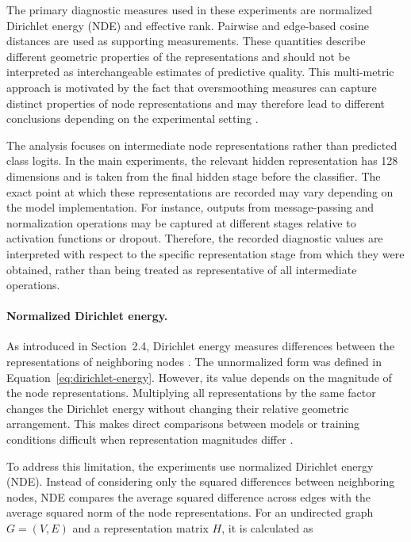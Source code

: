 \documentclass[english]{lni}
\begin{document}
The primary diagnostic measures used in these experiments are normalized Dirichlet energy (NDE) and effective rank. Pairwise and edge-based cosine distances are used as supporting measurements. These quantities describe different geometric properties of the representations and should not be interpreted as interchangeable estimates of predictive quality. This multi-metric approach is motivated by the fact that oversmoothing measures can capture distinct properties of node representations and may therefore lead to different conclusions depending on the experimental setting \cite{rusch2023oversmoothing,arnaiz2026demystifying,zhang2026measuring}.

The analysis focuses on intermediate node representations rather than predicted class logits. In the main experiments, the relevant hidden representation has 128 dimensions and is taken from the final hidden stage before the classifier. The exact point at which these representations are recorded may vary depending on the model implementation. For instance, outputs from message-passing and normalization operations may be captured at different stages relative to activation functions or dropout. Therefore, the recorded diagnostic values are interpreted with respect to the specific representation stage from which they were obtained, rather than being treated as representative of all intermediate operations.

\paragraph{Normalized Dirichlet energy.}

As introduced in Section~2.4, Dirichlet energy measures differences between the representations of neighboring
nodes \cite{rusch2023oversmoothing}. The unnormalized form was defined in Equation~\eqref{eq:dirichlet-energy}.
However, its value depends on the magnitude of the node representations. Multiplying all representations by the same factor changes the Dirichlet energy without changing their relative geometric arrangement. This makes direct comparisons between models or training conditions
difficult when representation magnitudes differ \cite{arnaiz2026demystifying}.

To address this limitation, the experiments use normalized Dirichlet energy (NDE). Instead of considering only the
squared differences between neighboring nodes, NDE compares the average squared difference across edges with the average squared norm of the node representations. For an undirected graph $G=(V,E)$ and a representation matrix $H$, it is calculated as
\end{document}
